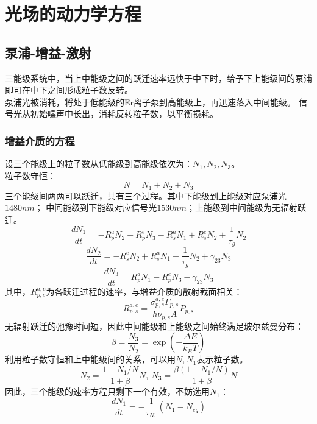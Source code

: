 \chapter{光场的动力学方程}
\label{chap:model1}

\fontsize{12bp}{14.4pt}

\section{泵浦-增益-激射}
三能级系统中，当上中能级之间的跃迁速率远快于中下时，给予下上能级间的泵浦即可在中下之间形成粒子数反转。\\
泵浦光被消耗，将处于低能级的Er离子泵到高能级上，再迅速落入中间能级。
信号光从初始噪声中长出，消耗反转粒子数，以平衡损耗。\\
\subsection{增益介质的方程}
设三个能级上的粒子数从低能级到高能级依次为：$N_1, N_2, N_3$。\\
粒子数守恒：
\[N = N_1 + N_2 + N_3\]
三个能级间两两可以跃迁，共有三个过程。其中下能级到上能级对应泵浦光$1480nm$；
中间能级到下能级对应信号光$1530nm$；上能级到中间能级为无辐射跃迁。\\
\[\frac{dN_1}{dt} = -R_p^a N_2 + R_p^e N_3 - R_s^a N_1 + R_s^e N_2 + \frac{1}{\tau_g} N_2\]
\[\frac{dN_2}{dt} = -R_s^e N_2 + R_s^a N_1 - \frac{1}{\tau_g} N_2 + \gamma_{23} N_3\]
\[\frac{dN_3}{dt} = R_p^a N_1 - R_p^e N_3 - \gamma_{23} N_3\]
其中，$R_{p,s}^{a,e}$为各跃迁过程的速率，与增益介质的散射截面相关：
\[R_{p,s}^{a,e} = \frac{\sigma_{p,s}^{a,e} \Gamma_{p,s}}{h\nu_{p,s} A} P_{p,s}\]
无辐射跃迁的弛豫时间短，因此中间能级和上能级之间始终满足玻尔兹曼分布：
\[\beta = \frac{N_3}{N_2} = \exp{(-\frac{\Delta E}{k_B T})}\]
利用粒子数守恒和上中能级间的关系，可以用$N,N_1$表示粒子数。
\[N_2 = \frac{1 - N_1/N}{1+\beta} N,\ N_3 = \frac{\beta(1 - N_1/N)}{1+\beta} N\]
因此，三个能级的速率方程只剩下一个有效，不妨选用$N_1$：
\[\frac{dN_1}{dt} = -\frac{1}{\tau_{N_1}} (N_1 - N_{eq})\]

